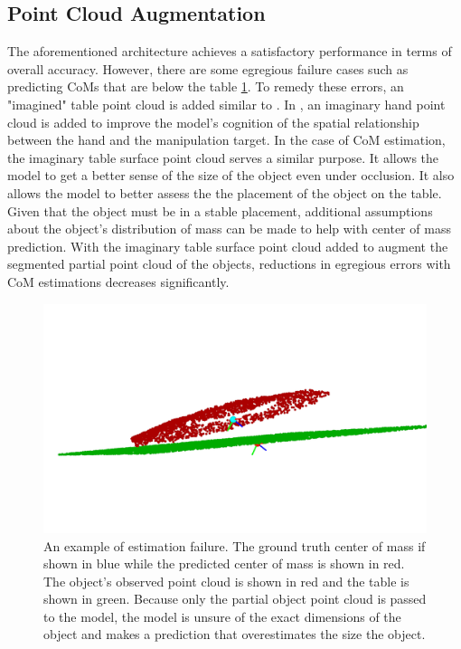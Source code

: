\documentclass[12pt]{ucsddissertation}
\begin{document}
\subsection{Point Cloud Augmentation}
The aforementioned architecture achieves a satisfactory performance in terms of overall accuracy. However, there are some egregious failure cases such as predicting CoMs that are below the table \ref{fig:failExample}. To remedy these errors, an "imagined" table point cloud is added similar to \cite{qin2022dexpoint}. In \cite{qin2022dexpoint}, an imaginary hand point cloud is added to improve the model's cognition of the spatial relationship between the hand and the manipulation target. In the case of CoM estimation, the imaginary table surface point cloud serves a similar purpose. It allows the model to get a better sense of the size of the object even under occlusion. It also allows the model to better assess the the placement of the object on the table. Given that the object must be in a stable placement, additional assumptions about the object's distribution of mass can be made to help with center of mass prediction. With the imaginary table surface point cloud added to augment the segmented partial point cloud of the objects, reductions in egregious errors with CoM estimations decreases significantly.

\begin{figure}
	\centering
	\includegraphics[width=0.6\linewidth]{figures/failExample.png}
	\caption[An example failure with unaugmented point cloud as input]{An example of estimation failure. The ground truth center of mass if shown in blue while the predicted center of mass is shown in red. The object's observed point cloud is shown in red and the table is shown in green. Because only the partial object point cloud is passed to the model, the model is unsure of the exact dimensions of the object and makes a prediction that overestimates the size the object.}
	\label{fig:failExample}
\end{figure}
\end{document}
